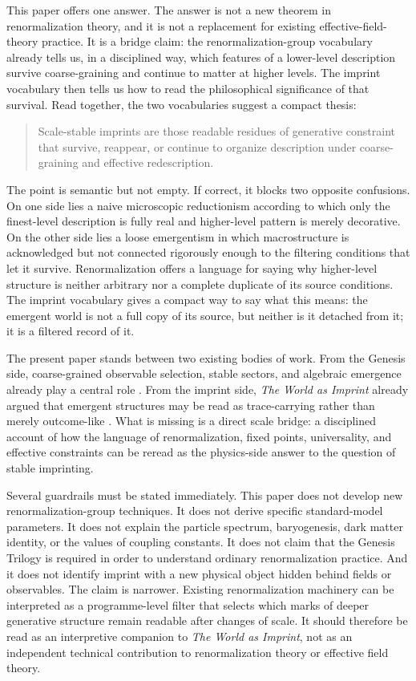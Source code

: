\documentclass[12pt,a4paper]{article}
\begin{document}
This paper offers one answer. The answer is not a new theorem in renormalization theory, and it is not a replacement for existing effective-field-theory practice. It is a bridge claim: the renormalization-group vocabulary already tells us, in a disciplined way, which features of a lower-level description survive coarse-graining and continue to matter at higher levels. The imprint vocabulary then tells us how to read the philosophical significance of that survival. Read together, the two vocabularies suggest a compact thesis:

\begin{quote}
Scale-stable imprints are those readable residues of generative constraint that survive, reappear, or continue to organize description under coarse-graining and effective redescription.
\end{quote}

The point is semantic but not empty. If correct, it blocks two opposite confusions. On one side lies a naive microscopic reductionism according to which only the finest-level description is fully real and higher-level pattern is merely decorative. On the other side lies a loose emergentism in which macrostructure is acknowledged but not connected rigorously enough to the filtering conditions that let it survive. Renormalization offers a language for saying why higher-level structure is neither arbitrary nor a complete duplicate of its source conditions. The imprint vocabulary gives a compact way to say what this means: the emergent world is not a full copy of its source, but neither is it detached from it; it is a filtered record of it.

The present paper stands between two existing bodies of work. From the Genesis side, coarse-grained observable selection, stable sectors, and algebraic emergence already play a central role \cite{HAFFA,HAFFD}. From the imprint side, \emph{The World as Imprint} already argued that emergent structures may be read as trace-carrying rather than merely outcome-like \cite{WorldImprint}. What is missing is a direct scale bridge: a disciplined account of how the language of renormalization, fixed points, universality, and effective constraints can be reread as the physics-side answer to the question of stable imprinting.

Several guardrails must be stated immediately. This paper does not develop new renormalization-group techniques. It does not derive specific standard-model parameters. It does not explain the particle spectrum, baryogenesis, dark matter identity, or the values of coupling constants. It does not claim that the Genesis Trilogy is required in order to understand ordinary renormalization practice. And it does not identify imprint with a new physical object hidden behind fields or observables. The claim is narrower. Existing renormalization machinery can be interpreted as a programme-level filter that selects which marks of deeper generative structure remain readable after changes of scale. It should therefore be read as an interpretive companion to \emph{The World as Imprint}, not as an independent technical contribution to renormalization theory or effective field theory.
\end{document}
